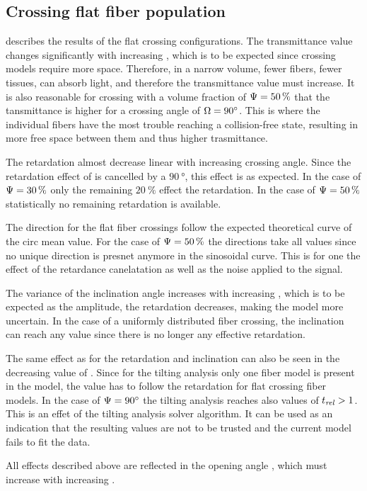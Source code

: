 \subsection{Crossing flat fiber population}
 describes the results of the flat crossing configurations.
The transmittance value changes significantly with increasing \modelOmega{}, which is to be expected since crossing models require more space.
Therefore, in a narrow volume, fewer fibers, \ie{} fewer tissues, can absorb light, and therefore the transmittance value must increase.
It is also reasonable for crossing with a volume fraction of $\textnormal{$\Psi$}=\SI{50}{\percent}$ that the tansmittance is higher for a crossing angle of $\textnormal{$\Omega$}=\SI{90}{\degree}$.
This is where the individual fibers have the most trouble reaching a collision-free state, resulting in more free space between them and thus higher trasmittance.
\par
%
The retardation almost decrease linear with increasing crossing angle.
Since the retardation effect of is cancelled by a $\SI{90}{\degree}$, this effect is as expected.
In the case of $\textnormal{$\Psi$}=\SI{30}{\percent}$ only the remaining $\SI{20}{\percent}$ effect the retardation.
In the case of $\textnormal{$\Psi$}=\SI{50}{\percent}$ statistically no remaining retardation is available.
\par
%
The direction for the flat fiber crossings follow the expected theoretical curve of the circ mean value.
For the case of $\textnormal{$\Psi$}=\SI{50}{\percent}$ the directions take all values since no unique direction is presnet anymore in the sinosoidal curve.
This is for one the effect of the retardance canelatation as well as the noise applied to the signal.
\par
%
The variance of the inclination angle increases with increasing \modelOmega{}, which is to be expected as the amplitude, \ie{} the retardation decreases, making the model more uncertain.
In the case of a uniformly distributed fiber crossing, the inclination can reach any value since there is no longer any effective retardation.
\par
%
The same effect as for the retardation and inclination can also be seen in the decreasing value of \trel{}.
Since for the tilting analysis only one fiber model is present in the model, the \trel{} value has to follow the retardation for flat crossing fiber models.
In the case of $\textnormal{$\Psi$}=\SI{90}{\degree}$ the tilting analysis reaches also values of $\textnormal{$t_\mathit{rel}$}>1$.
This is an effet of the tilting analysis solver algorithm.
It can be used as an indication that the resulting values are not to be trusted and the current model fails to fit the data.
\par
%
All effects described above are reflected in the opening angle \openingAngle{}, which must increase with increasing \modelOmega{}.
%
%
%
